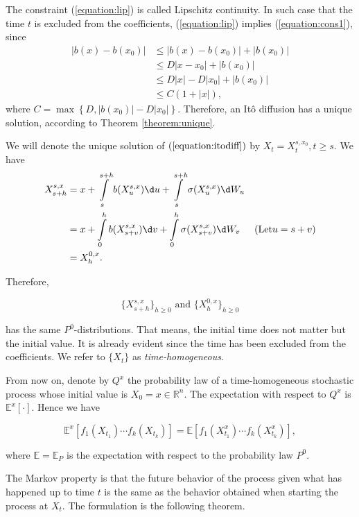 \begin{remark}
  The constraint (\ref{equation:lip}) is called Lipschitz continuity. In such case that the time $t$ is excluded from the coefficients, (\ref{equation:lip}) implies (\ref{equation:cons1}), since
  \begin{align*}
    |b(x)-b(x_0)| & \le |b(x)-b(x_0)| + |b(x_0)| \\
                  & \le  D|x-x_0| + |b(x_0)|     \\
                  & \le D|x|-D|x_0|+|b(x_0)|     \\
                  & \le C(1+|x|),
  \end{align*}
  where $C=\max\left\{D,|b(x_0)|-D|x_0|\right\}$. Therefore, an Itô diffusion has a unique solution, according to Theorem \ref{theorem:unique}.
\end{remark}

We will denote the unique solution of $(\ref{equation:itodiff})$ by $X_t=X^{s,x_0}_t, t\ge s$. We have
\begin{align*}
  X^{s,x}_{s+h} & = x+\int\limits_{s}^{s+h}b(X_u^{s,x})\d u+\int\limits_{s}^{s+h}\sigma(X_u^{s,x})\d W_u    &                    \\
                & =x+\int\limits_{0}^{h}b(X_{s+v}^{s,x})\d v+\int\limits_{0}^{h}\sigma(X_{s+v}^{s,x})\d W_v & (\text{Let} u=s+v) \\
                & = X^{0,x}_h.
\end{align*}

Therefore,

$$\{X_{s+h}^{s,x}\}_{h\ge0} \text{ and } \{X_{h}^{0,x}\}_{h\ge0}$$

has the same $P^0$-distributions. That means, the initial time does not matter but the initial value. It is already evident since the time has been excluded from the coefficients. We refer to $\{X_t\}$ as \textit{time-homogeneous}.

From now on, denote by $Q^x$ the probability law of a time-homogeneous stochastic process whose initial value is $X_0=x\in\mathbb{R}^n$. The expectation with respect to $Q^x$ is $\mathbb{E}^x[\cdot]$. Hence we have

$$\mathbb{E}^x\left[f_1(X_{t_1})\cdots f_k(X_{t_k})\right]=\mathbb{E}\left[f_1(X^x_{t_1})\cdots f_k(X^x_{t_k})\right],$$

where $\mathbb{E}=\mathbb{E}_P$ is the expectation with respect to the probability law $P^0$.

The Markov property is that the future behavior of the process given what has happened up to time $t$ is the
same as the behavior obtained when starting the process at $X_t$. The formulation is the following theorem.

